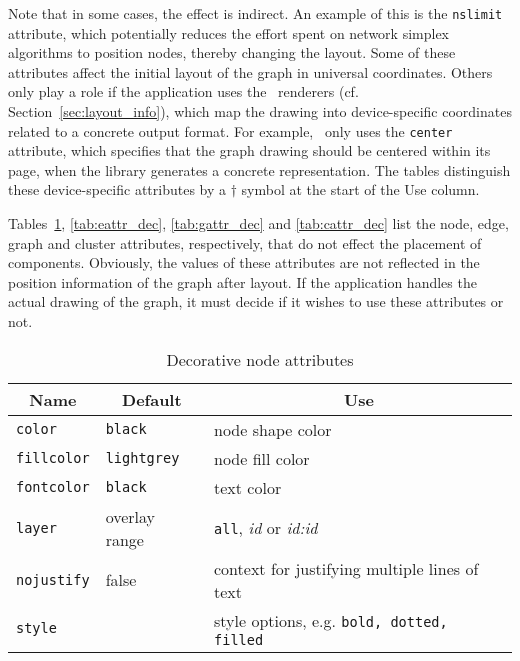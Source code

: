 Note that in some cases, the effect is indirect. An example of this is the
{\tt nslimit} attribute, which potentially reduces the effort spent on
network simplex algorithms to position nodes, thereby changing the layout.
Some of these attributes affect the initial layout of the graph in universal
coordinates. Others only play a role if the application uses the \gviz\
renderers (cf. Section~\ref{sec:layout_info}), 
which map the drawing into device-specific coordinates related to a
concrete output format.
For example, \gviz\ only uses the {\tt center} attribute, which specifies
that the graph drawing should be centered within its page, when the library
generates a concrete representation.
The tables distinguish these device-specific attributes by
a $\dagger$ symbol at the start of the Use column.

Tables~\ref{tab:nattr_dec}, \ref{tab:eattr_dec}, \ref{tab:gattr_dec} and
\ref{tab:cattr_dec} list the node, edge, graph and cluster 
attributes, respectively,
that do not effect the placement of components.
Obviously, the values of these attributes are not reflected in the
position information of the graph after layout. If the application
handles the actual drawing of the graph, it must decide if it wishes
to use these attributes or not.
\begin{table}[htbp]\footnotesize
\centering
\begin{tabular}[t]{|l|l|p{2.5in}|} \hline
\multicolumn{1}{|c|}{Name} & \multicolumn{1}{c|}{Default} & \multicolumn{1}{c|}{Use} \\ \hline
{\tt color} & {\tt black} & node shape color \\
{\tt fillcolor} & {\tt lightgrey} & node fill color \\
{\tt fontcolor} & {\tt black} & text color \\
{\tt layer} & overlay range & {\tt all}, {\it id} or {\it id:id} \\
{\tt nojustify} & false & context for justifying multiple lines of text \\
{\tt style} & & style options, e.g. {\tt bold, dotted, filled} \\ 
\hline
\end{tabular}
\caption{Decorative node attributes}
\label{tab:nattr_dec}
\end{table}
